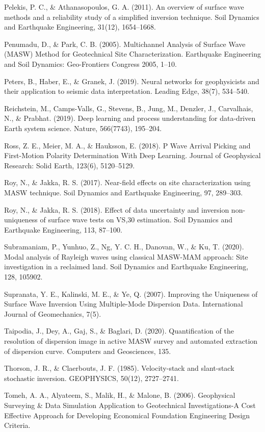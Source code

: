 Pelekis, P. C., \& Athanasopoulos, G. A. (2011). An overview of surface wave methods and a reliability study of a simplified inversion technique. Soil Dynamics and Earthquake Engineering, 31(12), 1654–1668. 

Penumadu, D., \& Park, C. B. (2005). Multichannel Analysis of Surface Wave (MASW) Method for Geotechnical Site Characterization. Earthquake Engineering and Soil Dynamics: Geo-Frontiers Congress 2005, 1–10. 

Peters, B., Haber, E., \& Granek, J. (2019). Neural networks for geophysicists and their application to seismic data interpretation. Leading Edge, 38(7), 534–540. 

Reichstein, M., Camps-Valls, G., Stevens, B., Jung, M., Denzler, J., Carvalhais, N., \& Prabhat. (2019). Deep learning and process understanding for data-driven Earth system science. Nature, 566(7743), 195–204. 

Ross, Z. E., Meier, M. A., \& Hauksson, E. (2018). P Wave Arrival Picking and First-Motion Polarity Determination With Deep Learning. Journal of Geophysical Research: Solid Earth, 123(6), 5120–5129. 

Roy, N., \& Jakka, R. S. (2017). Near-field effects on site characterization using MASW technique. Soil Dynamics and Earthquake Engineering, 97, 289–303. 

Roy, N., \& Jakka, R. S. (2018). Effect of data uncertainty and inversion non-uniqueness of surface wave tests on VS,30 estimation. Soil Dynamics and Earthquake Engineering, 113, 87–100. 

Subramaniam, P., Yunhuo, Z., Ng, Y. C. H., Danovan, W., \& Ku, T. (2020). Modal analysis of Rayleigh waves using classical MASW-MAM approach: Site investigation in a reclaimed land. Soil Dynamics and Earthquake Engineering, 128, 105902. 

Supranata, Y. E., Kalinski, M. E., \& Ye, Q. (2007). Improving the Uniqueness of Surface Wave Inversion Using Multiple-Mode Dispersion Data. International Journal of Geomechanics, 7(5). 

Taipodia, J., Dey, A., Gaj, S., \& Baglari, D. (2020). Quantification of the resolution of dispersion image in active MASW survey and automated extraction of dispersion curve. Computers and Geosciences, 135. 

Thorson, J. R., \& Claerbouts, J. F. (1985). Velocity-stack and slant-stack stochastic inversion. GEOPHYSICS, 50(12), 2727–2741. 

Tomeh, A. A., Alyateem, S., Malik, H., \& Malone, B. (2006). Geophysical Surveying \& Data Simulation Application to Geotechnical Investigations-A Cost Effective Approach for Developing Economical Foundation Engineering Design Criteria.

